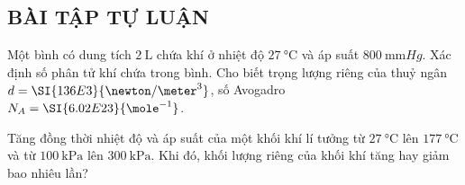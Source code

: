 \begin{ex}
\end{ex}
\subsection{BÀI TẬP TỰ LUẬN}
\setcounter{ex}{0}
\begin{ex}
	Một bình có dung tích $\SI{2}{\liter}$ chứa khí ở nhiệt độ $\SI{27}{\celsius}$ và áp suất $\SI{800}{\milli\meter Hg}$. Xác định số phân tử khí chứa trong bình. Cho biết trọng lượng riêng của thuỷ ngân $d=\SI{136E3}{\newton/\meter^3}$, số Avogadro $N_A=\SI{6.02E23}{\mole^{-1}}$.
\end{ex}
\begin{ex}
	Tăng đồng thời nhiệt độ và áp suất của một khối khí lí tưởng từ $\SI{27}{\celsius}$ lên $\SI{177}{\celsius}$ và từ $\SI{100}{\kilo\pascal}$ lên $\SI{300}{\kilo\pascal}$. Khi đó, khối lượng riêng của khối khí tăng hay giảm bao nhiêu lần?
\end{ex}
